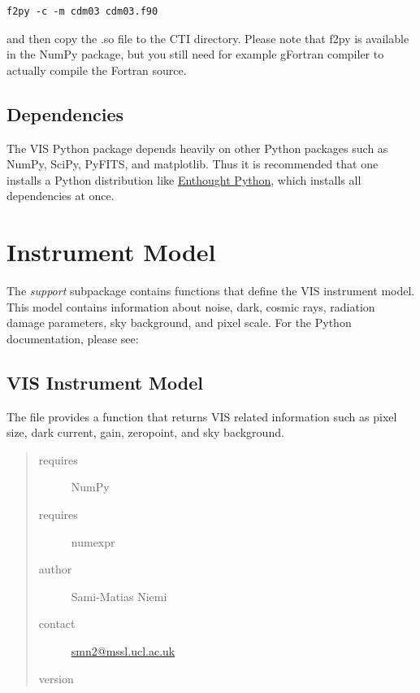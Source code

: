\documentclass[a4paper,11pt,english]{sphinxmanual}
\begin{document}
\begin{Verbatim}[commandchars=\\\{\}]
f2py -c -m cdm03 cdm03.f90
\end{Verbatim}

and then copy the .so file to the CTI directory. Please note that f2py is available in the NumPy package,
but you still need for example gFortran compiler to actually compile the Fortran source.


\section{Dependencies}
\label{index:dependencies}
The VIS Python package depends heavily on other Python packages such as NumPy, SciPy, PyFITS, and matplotlib.
Thus it is recommended that one installs a Python distribution like \href{http://www.enthought.com/}{Enthought Python},
which installs all dependencies at once.


\chapter{Instrument Model}
\label{index:instrument-model}
The \emph{support} subpackage contains functions that define the VIS instrument model. This model contains information
about noise, dark, cosmic rays, radiation damage parameters, sky background, and pixel scale. For the Python
documentation, please see:
\label{instrument:module-support.VISinstrumentModel}

\section{VIS Instrument Model}
\label{instrument:vis-instrument-model}\label{instrument::doc}
The file provides a function that returns VIS related information such as pixel
size, dark current, gain, zeropoint, and sky background.
\begin{quote}\begin{description}
\item[{requires}] \leavevmode
NumPy

\item[{requires}] \leavevmode
numexpr

\item[{author}] \leavevmode
Sami-Matias Niemi

\item[{contact}] \leavevmode
\href{mailto:smn2@mssl.ucl.ac.uk}{smn2@mssl.ucl.ac.uk}

\item[{version}] 

\end{description}\end{quote}
\end{document}

